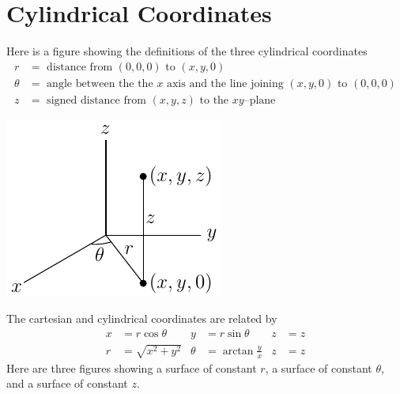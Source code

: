 \section{Cylindrical Coordinates}\label{ap:cylCoord}

Here is a figure showing the definitions of the 
three cylindrical coordinates 
\begin{align*}
r&=\text{ distance from }(0,0,0)\text{ to }(x,y,0)\\
\theta&=\text{ angle between the the $x$ axis and the line joining $(x,y,0)$ to $(0,0,0)$}\\
z&=\text{ signed distance from }(x,y,z)
\text{ to the $xy$--plane}
\end{align*}
\begin{efig}
\begin{center}
    \includegraphics{cyl1.pdf}
\end{center}
\end{efig}
The cartesian and cylindrical coordinates
are related by
\begin{align*}
x&=r\cos\theta &
y&=r\sin\theta &
z&=z \\
    r&=\sqrt{x^2+y^2} &
    \theta&=\arctan\frac{y}{x} &
    z&=z
\end{align*}
Here are three figures showing a surface of constant $r$,
a surface of constant $\theta$, and a surface of constant $z$.
